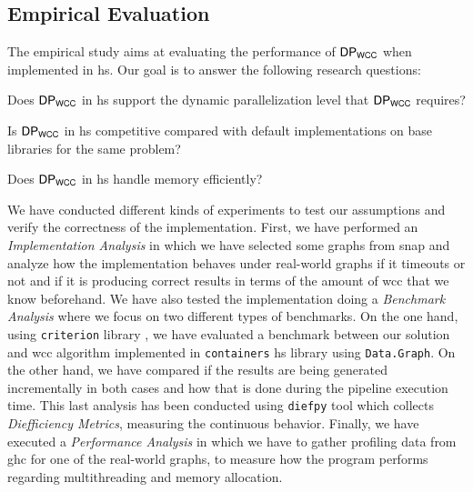 \subsection{Empirical Evaluation}\label{sec:evaluation}
The empirical study aims at evaluating the performance of $\mathsf{DP_{WCC}}$ when implemented in \acrshort{hs}. 
Our goal is to answer the following research questions: 

\begin{inparaenum}[\bf {\bf RQ}1\upshape)]
\label{res:question}
    \item Does $\mathsf{DP_{WCC}}$ in \acrshort{hs} support the dynamic parallelization level that $\mathsf{DP_{WCC}}$ requires?
    \item Is $\mathsf{DP_{WCC}}$ in \acrshort{hs} competitive compared with default implementations on base libraries for the same problem?
    \item Does $\mathsf{DP_{WCC}}$ in \acrshort{hs} handle memory efficiently?
\end{inparaenum}

We have conducted different kinds of experiments to test our assumptions and verify the correctness of the implementation.
First, we have performed an \emph{Implementation Analysis} in which we have selected some graphs from \acrfull{snap} \cite{stanford} and analyze how the implementation behaves under real-world graphs if it timeouts or not and if it is producing correct results in terms of the amount of \acrshort{wcc} that we know beforehand.
We have also tested the implementation doing a \emph{Benchmark Analysis} where we focus on two different types of benchmarks. On the one hand, using \texttt{criterion} library \cite{criterion}, we have evaluated a benchmark between our solution and \acrshort{wcc} algorithm implemented in \texttt{containers} \acrshort{hs} library \cite{containers} using \texttt{Data.Graph}. On the other hand, we have compared if the results are being generated incrementally in both cases and how that is done during the pipeline execution time. 
This last analysis has been conducted using \texttt{diefpy} tool \cite{diefpaper,diefpy} which collects \textit{Diefficiency Metrics}, measuring the continuous behavior.
Finally, we have executed a \textit{Performance Analysis} in which we have to gather profiling data from \acrfull{ghc} for one of the real-world graphs, to measure how the program performs regarding multithreading and memory allocation.

